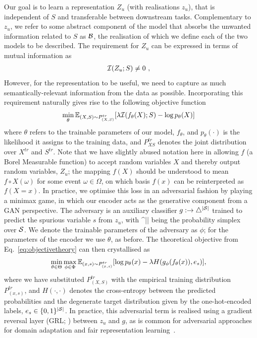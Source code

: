 Our goal is to learn a representation $Z_u$ (with realisations \(z_u\)), that is independent of $S$
and transferable between downstream tasks. 
%
Complementary to $z_u$, we refer to some abstract component of the model that absorbs the unwanted
information related to $S$ as ${\mathcal{B}}$, the realisation of which we define \wrt{} each of the two
models to be described.
The requirement for $Z_u$ can be expressed in terms of mutual information as
%
\begin{align}
  {\mathcal{I}}(Z_u; S) \neq 0~,
  \label{eq:migoal}
\end{align}
%
However, for the representation to be useful, we need to capture as much semantically-relevant
information from the data as possible. 
%
Incorporating this requirement naturally gives rise to the following objective function
%
\begin{align}
  \min_{\theta}
  \mathbb{E}_{(X,S) \sim P^{tr}_{(X, S)}} [
  \lambda {\mathcal{I}}(f_\theta(X);S) -\log p_\theta(X) 
  ]
  \label{eq:objectivetheory}
\end{align}
%
where $\theta$ refers to the trainable parameters of our model, \( f_\theta \), and \(
p_\theta(\cdot) \) is the likelihood it assigns to the training data, and \( P^{tr}_{XS} \) denotes
the joint distribution over \( X^{tr} \) and \( S^{tr} \).
%
Note that we have slightly abused notation here in allowing \(f\) (a Borel Measurable function) to
accept random variables \(X\) and thereby output random variables, \(Z_u\); the mapping \(f(X)\)
should be understood to mean \( f \circ X(\omega) \) for some event \( \omega \in \Omega \), on
which basis \( f(x) \) can be reinterpreted as \( f(X=x) \).
%
In practice, we optimise this loss in an adversarial fashion by playing a minimax game, in which
our encoder acts as the generative component from a GAN \citep{goddfellow2014generative}
perspective.
%
The adversary is an auxiliary classifier \(g: \to \bigtriangleup^{|{\mathcal{S}}|} \) trained to predict the
spurious variable \(s\) from \(z_u\), with \bigtriangleup^{|\gS|} being the probability simplex
over \({\mathcal{S}}\).
%
We denote the trainable parameters of the adversary as $\phi$; for the parameters of the encoder we
use $\theta$, as before. 
%
The theoretical objective from Eq.~\ref{eq:objectivetheory} can then crystallised as
%
\begin{align}
  \min_{ \theta \in \Theta} \max_{\phi \in \Phi}
  \mathbb{E}_{(x, s) \sim P^{tr}_{(x,s)}}[
  \log p_\theta(x)
  -\lambda H( g_\phi ( f_\theta(x) ), e_{s})
  ],
  \label{eq:objectivepractical}
\end{align} 
%
where we have substituted \( P^{ tr }_{ (X, S) } \) with the empirical training distribution \( P^{
tr }_{ (x, s) } \), and \( H(\cdot, \cdot) \) denotes the cross-entropy between the predicted
probabilities and the degenerate target distribution given by the one-hot-encoded labels, $e_{s}
\in \{0, 1\}^{|{\mathcal{S}}|}$.
%
In practice, this adversarial term is realised using a gradient reversal layer (GRL;
\cite{ganin2016domain}) between \(z_u\) and \(g\), as is common for adversarial approaches for
domain adaptation and fair representation learning~\citep{edwards2016censoring}.
%
